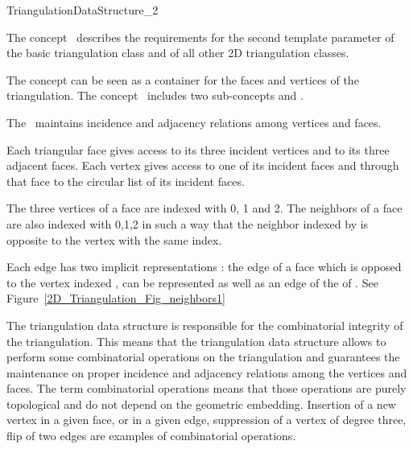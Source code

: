 
\begin{ccRefConcept}{TriangulationDataStructure_2}

\ccDefinition
  
The concept \ccRefName\ describes the requirements  for
the second template parameter of the basic triangulation class
 and of all other 2D triangulation classes.

The concept can be seen as a container for the 
faces and vertices of the triangulation.
The concept \ccRefName\  includes two sub-concepts
 and
. 

The \ccRefName\ 
maintains incidence and adjacency relations
among vertices and faces.

Each triangular face gives access to its three incident vertices 
and to its three adjacent faces. 
Each vertex gives access to one of its incident faces
and through that face to the circular list of its incident faces.

The three vertices of a face are indexed with 0, 1 and 2.
The neighbors of a face are also 
indexed with 0,1,2 in such a way that the neighbor indexed by 
is opposite to the vertex with the same index.

Each edge has two implicit representations : the edge
of a face   which is opposed to the vertex indexed ,
can be represented as well as an edge of the \ccc{neighbor(i)} of 
\ccc{f}. See Figure~\ref{2D_Triangulation_Fig_neighbors1}


The triangulation data structure
 is responsible for  the combinatorial integrity of the triangulation.
This means that the triangulation data structure
allows to perform some combinatorial operations
on the triangulation and guarantees the maintenance on 
proper incidence and adjacency relations among the vertices
and faces. The term combinatorial operations
 means that those operations are purely topological
and do not depend on the geometric embedding.
Insertion of a new vertex in a given face, or in a given edge,
suppression of a vertex of degree three,  flip of two edges
are examples of combinatorial operations.




\end{ccRefConcept}
